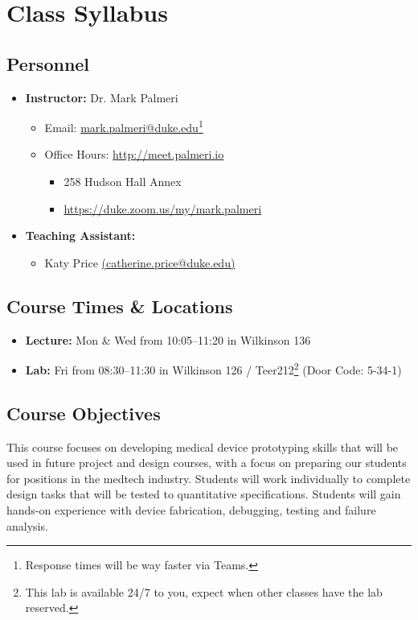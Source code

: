 \documentclass[10pt]{report}
\begin{document}
\section*{Class Syllabus}

\subsection*{Personnel}
\begin{itemize}
    \item[] \textbf{Instructor:} Dr. Mark Palmeri
    \begin{itemize}
        \item Email: \href{mailto:mark.palmeri@duke.edu}{mark.palmeri@duke.edu}\footnote{Response times will be way
        faster via Teams.}
        \item Office Hours: \url{http://meet.palmeri.io}
        \begin{itemize}
            \item 258 Hudson Hall Annex
            \item \url{https://duke.zoom.us/my/mark.palmeri}
        \end{itemize}
    \end{itemize}
    \item[] \textbf{Teaching Assistant:} 
    \begin{itemize}
        \item Katy Price \href{mailto:catherine.price@duke.edu}{(catherine.price@duke.edu)}
    \end{itemize}
\end{itemize}

\subsection*{Course Times \& Locations}
\begin{itemize}
    \item[] \textbf{Lecture:} Mon \& Wed from 10:05--11:20 in Wilkinson 136

    \item[] \textbf{Lab:} Fri from 08:30--11:30 in Wilkinson 126 /
    Teer212\footnote{This lab is available 24/7 to you, expect when other
    classes have the lab reserved.} (Door Code: 5-34-1)
\end{itemize}

\subsection*{Course Objectives}
This course focuses on developing medical device prototyping skills that will be
used in future project and design courses, with a focus on preparing our
students for positions in the medtech industry.  Students will work individually
to complete design tasks that will be tested to quantitative specifications.
Students will gain hands-on experience with device fabrication, debugging,
testing and failure analysis.
\end{document}
